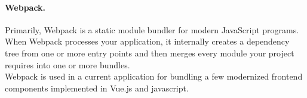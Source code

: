 \paragraph*{Webpack.} Primarily, Webpack is a static module bundler for modern JavaScript programs. When Webpack processes your application, it internally creates a dependency tree from one or more entry points and then merges every module your project requires into one or more bundles. \cite{webpack-doc}\\
Webpack is used in a current application for bundling a few modernized frontend components implemented in Vue.js and javascript.

